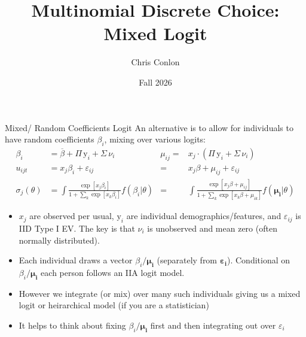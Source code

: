 \documentclass[aspectratio=169,11pt]{beamer}
\title{Multinomial Discrete Choice: Mixed Logit}
\author{Chris Conlon}
\institute{Grad IO}
\date{Fall 2026}
\begin{document}
\frame{\titlepage}


\begin{frame}{Mixed/ Random Coefficients Logit}
\small
An alternative is to allow for individuals to have \alert{random coefficients} $\beta_i$, mixing over various logits:
\begin{align*}
\beta_i &= \overline{\beta} + \Pi \, \textrm{y}_i  + \Sigma \, \nu_i
&\mu_{ij}=&   x_{j} \cdot \left(  \Pi \, \textrm{y}_i + \Sigma \, \nu_{i} \right) \\
u_{ijt} &= x_j \beta_i + \varepsilon_{ij}
&=&  x_j \beta  + \mu_{ij}+ \varepsilon_{ij}   \\
\sigma_{j}(\theta) &= \int \frac{\exp[x_{j} \beta_i ]}{1+\sum_k \exp[x_{k} \beta_i ]} f(\beta_i | \theta)
&=& \int \frac{\exp[x_{j} \beta + \mu_{ij} ]}{1+\sum_k \exp[x_{k} \beta+ \mu_{ik} ]} f(\symbf{\mu_i} | \theta)
\end{align*}
 \begin{itemize}
 \item $x_{j}$ are observed per usual, $\textrm{y}_i$ are individual demographics/features, and $\varepsilon_{ij}$ is IID Type I EV. The key is that $\nu_i$ is unobserved and mean zero (often normally distributed).
 \item Each individual draws a vector $\beta_i\symbf{/\mu_i}$ (separately from $\symbf{\varepsilon_i}$). Conditional on $\beta_i\symbf{/\mu_i}$ each person follows an IIA logit model.
 \item However we integrate (or mix) over many such individuals giving us a \alert{mixed logit} or \alert{heirarchical model} (if you are a statistician)
 \item It helps to think about fixing $\beta_i\symbf{/\mu_i}$ first and then integrating out over $\varepsilon_i$
 \end{itemize}
\end{frame}
\end{document}
